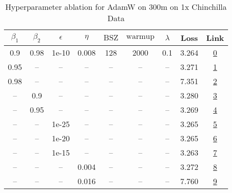 \begin{table}[H]
\centering
\caption{Hyperparameter ablation for AdamW on 300m on 1x Chinchilla Data}
\label{tab:ablation_adamw_300m_1}
\begin{tabular}{ccccccccc}
\toprule
$\beta_1$ & $\beta_2$ & $\epsilon$ & $\eta$ & $\mathrm{BSZ}$ & $\mathrm{warmup}$ & $\lambda$ & Loss & Link \\
\midrule
0.9 & 0.98 & 1e-10 & 0.008 & 128 & 2000 & 0.1 & 3.264 & \href{https://wandb.ai/stanford-mercury/optimizer-scaling/runs/sweep-300m-6B-adamwa7aafelr0.008-wd0.1-minlr0-warmup2000-b10.9-b-990eda}{0} \\
\midrule
0.95 & -- & -- & -- & -- & -- & -- & 3.271 & \href{https://wandb.ai/stanford-mercury/optimizer-scaling/runs/sweep-300m-6B-adamw55fc1flr0.008-wd0.1-minlr0-warmup2000-b10.95--b7196b}{1} \\
0.98 & -- & -- & -- & -- & -- & -- & 7.351 & \href{https://wandb.ai/stanford-mercury/optimizer-scaling/runs/sweep-300m-6B-adamw3aa56elr0.008-wd0.1-minlr0-warmup2000-b10.98--36a5e7}{2} \\
-- & 0.9 & -- & -- & -- & -- & -- & 3.280 & \href{https://wandb.ai/stanford-mercury/optimizer-scaling/runs/sweep-300m-6B-adamw72a6d2lr0.008-wd0.1-minlr0-warmup2000-b10.9-b-dde1e5}{3} \\
-- & 0.95 & -- & -- & -- & -- & -- & 3.269 & \href{https://wandb.ai/stanford-mercury/optimizer-scaling/runs/sweep-300m-6B-adamw901abclr0.008-wd0.1-minlr0-warmup2000-b10.9-b-de77a3}{4} \\
-- & -- & 1e-25 & -- & -- & -- & -- & 3.265 & \href{https://wandb.ai/stanford-mercury/optimizer-scaling/runs/sweep-300m-6B-adamwfa0d44lr0.008-wd0.1-minlr0-warmup2000-b10.9-b-89eba9}{5} \\
-- & -- & 1e-20 & -- & -- & -- & -- & 3.265 & \href{https://wandb.ai/stanford-mercury/optimizer-scaling/runs/sweep-300m-6B-adamw057b30lr0.008-wd0.1-minlr0-warmup2000-b10.9-b-cff503}{6} \\
-- & -- & 1e-15 & -- & -- & -- & -- & 3.263 & \href{https://wandb.ai/stanford-mercury/optimizer-scaling/runs/sweep-300m-6B-adamw863e5alr0.008-wd0.1-minlr0-warmup2000-b10.9-b-8395a7}{7} \\
-- & -- & -- & 0.004 & -- & -- & -- & 3.272 & \href{https://wandb.ai/stanford-mercury/optimizer-scaling/runs/sweep-300m-6B-adamw0c32aelr0.004-wd0.1-minlr0-warmup2000-b10.9-b-a044c7}{8} \\
-- & -- & -- & 0.016 & -- & -- & -- & 7.760 & \href{https://wandb.ai/stanford-mercury/optimizer-scaling/runs/sweep-300m-6B-adamw2c8c47lr0.016-wd0.1-minlr0-warmup2000-b10.9-b-689737}{9} \\

\end{tabular}
\end{table}
